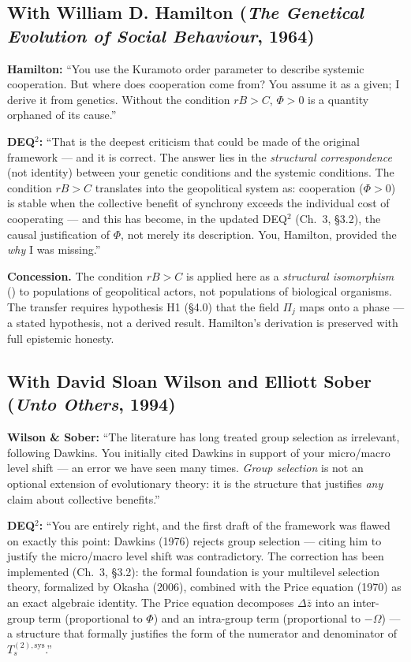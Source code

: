 \subsection{With William D. Hamilton (\emph{The Genetical Evolution of
Social Behaviour}, 1964)}\label{con-hamilton-1964}

\textbf{Hamilton:} ``You use the Kuramoto order parameter to describe
systemic cooperation. But where does cooperation come from? You assume it
as a given; I derive it from genetics. Without the condition $rB > C$,
$\Phi > 0$ is a quantity orphaned of its cause.''

\textbf{DEQ$^2$:} ``That is the deepest criticism that could be made of
the original framework --- and it is correct. The answer lies in the
\emph{structural correspondence} (not identity) between your genetic
conditions and the systemic conditions. The condition $rB > C$ translates
into the geopolitical system as: cooperation ($\Phi > 0$) is stable when
the collective benefit of synchrony exceeds the individual cost of
cooperating --- and this has become, in the updated DEQ$^2$ (Ch.~3,
§3.2), the causal justification of $\Phi$, not merely its description.
You, Hamilton, provided the \emph{why} I was missing.''

\textbf{Concession.} The condition $rB > C$ is applied here as a
\emph{structural isomorphism} (\Hypoth{}) to populations of geopolitical
actors, not populations of biological organisms. The transfer requires
hypothesis H1 (§4.0) that the field $\Pi_j$ maps onto a phase --- a
stated hypothesis, not a derived result. Hamilton's derivation is
preserved with full epistemic honesty.

\subsection{With David Sloan Wilson and Elliott Sober (\emph{Unto Others},
1994)}\label{con-wilson-sober-1994}

\textbf{Wilson \& Sober:} ``The literature has long treated group
selection as irrelevant, following Dawkins. You initially cited Dawkins
in support of your micro/macro level shift --- an error we have seen many
times. \emph{Group selection} is not an optional extension of
evolutionary theory: it is the structure that justifies \emph{any} claim
about collective benefits.''

\textbf{DEQ$^2$:} ``You are entirely right, and the first draft of the
framework was flawed on exactly this point: Dawkins (1976) rejects group
selection --- citing him to justify the micro/macro level shift was
contradictory. The correction has been implemented (Ch.~3, §3.2): the
formal foundation is your multilevel selection theory, formalized by
Okasha (2006), combined with the Price equation (1970) as an exact
algebraic identity. The Price equation decomposes $\Delta\bar{z}$ into
an inter-group term (proportional to $\Phi$) and an intra-group term
(proportional to $-\Omega$) --- a structure that formally justifies the
form of the numerator and denominator of $T_s^{(2),\text{sys}}$.''

